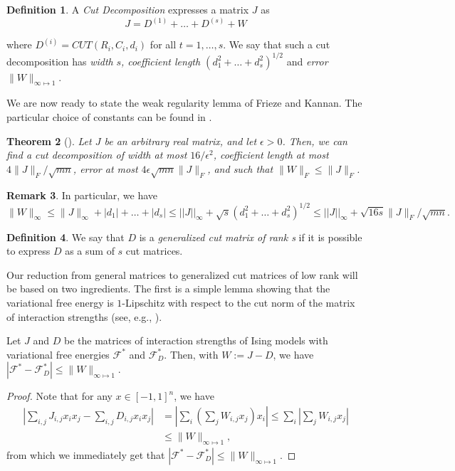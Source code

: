 \documentclass[final, 12pt]{colt2018}
\newcommand{\F}{\mathcal{F}}
\newtheorem{defn}[theorem]{Definition}
\newtheorem{theorem}{Theorem}[section]
\theoremstyle{definition}
\newtheorem{defn}[theorem]{Definition}
\newtheorem{remark}[theorem]{Remark}
\theoremstyle{plain}
\begin{document}
\begin{defn}
A \emph{Cut Decomposition }expresses a matrix $J$ as 
\[
J=D^{(1)}+\dots+D^{(s)}+W
\]

where $D^{(i)}=CUT(R_{i},C_{i},d_{i})$ for all $t=1,\dots,s$. 
We say that such a cut decomposition has \emph{width }$s$\emph{,
coefficient length $(d_{1}^{2}+\dots+d_{s}^{2})^{1/2}$ }and \emph{error
$\|W\|_{\infty\mapsto1}$}.
\end{defn}

We are now ready to state the weak regularity lemma of Frieze and Kannan. The particular choice of constants can be found in \citep{alon-etal-samplingCSP-conference}. 
\begin{theorem}[\citet{frieze-kannan-matrix}]
\label{fk}
Let $J$ be an arbitrary real matrix, and let $\epsilon>0$.
Then, we can find a cut decomposition of width at most $16/\epsilon^{2}$, 
coefficient length at most $4\|J\|_{F}/\sqrt{mn}$, error at most $4\epsilon\sqrt{mn}\|J\|_{F}$, and such that $\|W\|_{F}\leq\|J\|_{F}$.  
\end{theorem}

\begin{remark}
\label{rmk:infty-norm-bound}
In particular, we have $$\|W\|_{\infty}\leq \|J\|_{\infty}+|d_{1}|+\dots+|d_{s}|\leq||J||_{\infty}+\sqrt{s}(d_{1}^{2}+\dots+d_{s}^{2})^{1/2}\leq||J||_{\infty}+\sqrt{16s}\|J\|_{F}/\sqrt{mn}.$$

\end{remark}

\begin{defn}
We say that $D$ is a \emph{generalized cut matrix of rank s}  if it is possible to express $D$ as a sum of $s$ cut matrices.  
\end{defn}

Our reduction from general matrices to generalized cut matrices of low rank will be based on two ingredients. The first is a simple lemma showing that the variational free energy is $1$-Lipschitz with respect to the cut norm of the matrix of interaction strengths (see, e.g., \citep{previous-paper}). 
\begin{lemma}
\label{lemma: free-energy-lipschitz} 
Let $J$ and $D$ be the matrices of interaction strengths of 
Ising models with variational free energies $\F^{*}$ and $\F^{*}_{D}$. Then, with $W:= J - D$, we have  
$|\F^{*}-\F^{*}_{D}|\leq\|W\|_{\infty \mapsto 1}$. 
\end{lemma}
\begin{proof}
Note that for any $x\in[-1,1]^{n}$, we have 
\begin{align*}
\left|\sum_{i,j}J_{i,j}x_{i}x_{j}-\sum_{i,j}D_{i,j}x_{i}x_{j}\right| & =\left|\sum_{i}(\sum_{j}W_{i,j}x_{j})x_{i}\right| \leq \sum_{i}\left|\sum_{j}W_{i,j}x_{j}\right|\\
 & \leq\|W\|_{\infty\mapsto1}, 
\end{align*}
from which we immediately get that $|\F^{*}-\F^{*}_{D}|\leq\|W\|_{\infty \mapsto 1}$. 
\end{proof}
\end{document}
